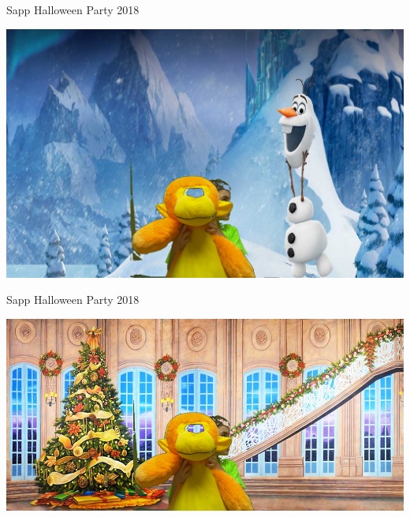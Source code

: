 \documentclass[12pt,a4paper]{article}
\begin{document}
\centering
Sapp Halloween Party 2018
\newline
\newline
\centerline{\includegraphics{result}}
\newline
\newline
\newline
\newline
\centering
Sapp Halloween Party 2018
\newline
\newline
\centerline{\includegraphics{result2}} 
\end{document}
